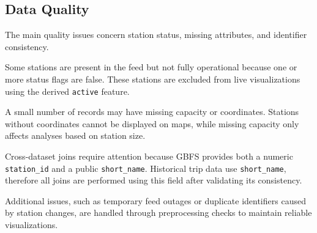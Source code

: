 \subsection{Data Quality}

The main quality issues concern station status, missing attributes, and identifier consistency.

Some stations are present in the feed but not fully operational because one or more status flags are false. These stations are excluded from live visualizations using the derived \texttt{active} feature.

A small number of records may have missing capacity or coordinates. Stations without coordinates cannot be displayed on maps, while missing capacity only affects analyses based on station size.

Cross-dataset joins require attention because GBFS provides both a numeric \texttt{station\_id} and a public \texttt{short\_name}. Historical trip data use \texttt{short\_name}, therefore all joins are performed using this field after validating its consistency.

Additional issues, such as temporary feed outages or duplicate identifiers caused by station changes, are handled through preprocessing checks to maintain reliable visualizations.